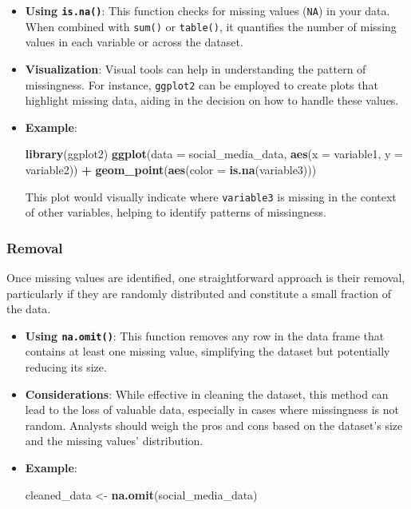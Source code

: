 \documentclass[
]{book}
\newenvironment{Shaded}{\begin{snugshade}}{\end{snugshade}}
\newcommand{\AttributeTok}[1]{\textcolor[rgb]{0.13,0.29,0.53}{#1}}
\newcommand{\FunctionTok}[1]{\textcolor[rgb]{0.13,0.29,0.53}{\textbf{#1}}}
\newcommand{\NormalTok}[1]{#1}
\newcommand{\OtherTok}[1]{\textcolor[rgb]{0.56,0.35,0.01}{#1}}
\newcommand{\SpecialCharTok}[1]{\textcolor[rgb]{0.81,0.36,0.00}{\textbf{#1}}}
\begin{document}
\begin{itemize}
\item
  \textbf{Using \texttt{is.na()}}: This function checks for missing values (\texttt{NA}) in your data. When combined with \texttt{sum()} or \texttt{table()}, it quantifies the number of missing values in each variable or across the dataset.
\item
  \textbf{Visualization}: Visual tools can help in understanding the pattern of missingness. For instance, \texttt{ggplot2} can be employed to create plots that highlight missing data, aiding in the decision on how to handle these values.
\item
  \textbf{Example}:

\begin{Shaded}
\begin{Highlighting}[]
\FunctionTok{library}\NormalTok{(ggplot2)}
\FunctionTok{ggplot}\NormalTok{(}\AttributeTok{data =}\NormalTok{ social\_media\_data, }\FunctionTok{aes}\NormalTok{(}\AttributeTok{x =}\NormalTok{ variable1, }\AttributeTok{y =}\NormalTok{ variable2)) }\SpecialCharTok{+}
  \FunctionTok{geom\_point}\NormalTok{(}\FunctionTok{aes}\NormalTok{(}\AttributeTok{color =} \FunctionTok{is.na}\NormalTok{(variable3)))}
\end{Highlighting}
\end{Shaded}

  This plot would visually indicate where \texttt{variable3} is missing in the context of other variables, helping to identify patterns of missingness.
\end{itemize}

\hypertarget{removal}{%
\subsubsection{Removal}\label{removal}}

Once missing values are identified, one straightforward approach is their removal, particularly if they are randomly distributed and constitute a small fraction of the data.

\begin{itemize}
\item
  \textbf{Using \texttt{na.omit()}}: This function removes any row in the data frame that contains at least one missing value, simplifying the dataset but potentially reducing its size.
\item
  \textbf{Considerations}: While effective in cleaning the dataset, this method can lead to the loss of valuable data, especially in cases where missingness is not random. Analysts should weigh the pros and cons based on the dataset's size and the missing values' distribution.
\item
  \textbf{Example}:

\begin{Shaded}
\begin{Highlighting}[]
\NormalTok{cleaned\_data }\OtherTok{\textless{}{-}} \FunctionTok{na.omit}\NormalTok{(social\_media\_data)}
\end{Highlighting}
\end{Shaded}
\end{itemize}
\end{document}

